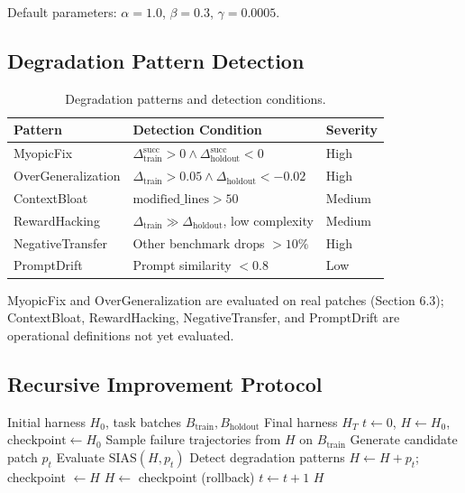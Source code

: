 \documentclass{article}
\begin{document}
Default parameters: $\alpha=1.0$, $\beta=0.3$, $\gamma=0.0005$.

\subsection{Degradation Pattern Detection}

\begin{table}[h]
\centering
\caption{Degradation patterns and detection conditions.}
\label{tab:patterns}
\begin{tabular}{lll}
\toprule
\textbf{Pattern} & \textbf{Detection Condition} & \textbf{Severity} \\
\midrule
MyopicFix & $\Delta_{\text{train}}^{\text{succ}} > 0 \wedge \Delta_{\text{holdout}}^{\text{succ}} < 0$ & High \\
OverGeneralization & $\Delta_{\text{train}} > 0.05 \wedge \Delta_{\text{holdout}} < -0.02$ & High \\
ContextBloat & $\text{modified\_lines} > 50$ & Medium \\
RewardHacking & $\Delta_{\text{train}} \gg \Delta_{\text{holdout}}$, low complexity & Medium \\
NegativeTransfer & Other benchmark drops $> 10\%$ & High \\
PromptDrift & Prompt similarity $< 0.8$ & Low \\
\bottomrule
\end{tabular}
\end{table}
\noindent MyopicFix and OverGeneralization are evaluated on real patches (Section 6.3); ContextBloat, RewardHacking, NegativeTransfer, and PromptDrift are operational definitions not yet evaluated.

\subsection{Recursive Improvement Protocol}

\begin{algorithm}[h]
\caption{SIAS-Gated Recursive Improvement}
\label{alg:protocol}
\begin{algorithmic}[1]
\REQUIRE Initial harness $H_0$, task batches $B_{\text{train}}, B_{\text{holdout}}$
\ENSURE Final harness $H_T$
\STATE $t \leftarrow 0$, $H \leftarrow H_0$, $\text{checkpoint} \leftarrow H_0$
    \STATE Sample failure trajectories from $H$ on $B_{\text{train}}$
    \STATE Generate candidate patch $p_t$
    \STATE Evaluate $\text{SIAS}(H, p_t)$
    \STATE Detect degradation patterns
        \STATE $H \leftarrow H + p_t$; checkpoint $\leftarrow H$
        \STATE $H \leftarrow$ checkpoint (rollback)
    \ENDIF
    \STATE $t \leftarrow t + 1$
\ENDWHILE
\RETURN $H$
\end{algorithmic}
\end{algorithm}
\end{document}
